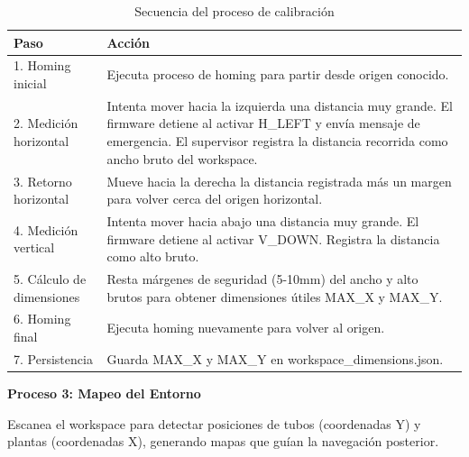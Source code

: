 \begin{table}[H]
\centering
\small
\begin{tabular}{|l|p{10cm}|}
\hline
\textbf{Paso} & \textbf{Acción} \\
\hline
1. Homing inicial & Ejecuta proceso de homing para partir desde origen conocido. \\
\hline
2. Medición horizontal & Intenta mover hacia la izquierda una distancia muy grande. El firmware detiene al activar H\_LEFT y envía mensaje de emergencia. El supervisor registra la distancia recorrida como ancho bruto del workspace. \\
\hline
3. Retorno horizontal & Mueve hacia la derecha la distancia registrada más un margen para volver cerca del origen horizontal. \\
\hline
4. Medición vertical & Intenta mover hacia abajo una distancia muy grande. El firmware detiene al activar V\_DOWN. Registra la distancia como alto bruto. \\
\hline
5. Cálculo de dimensiones & Resta márgenes de seguridad (5-10mm) del ancho y alto brutos para obtener dimensiones útiles MAX\_X y MAX\_Y. \\
\hline
6. Homing final & Ejecuta homing nuevamente para volver al origen. \\
\hline
7. Persistencia & Guarda MAX\_X y MAX\_Y en workspace\_dimensions.json. \\
\hline
\end{tabular}
\caption{Secuencia del proceso de calibración}
\label{tab:proceso_calibracion}
\end{table}

\textbf{Proceso 3: Mapeo del Entorno}

Escanea el workspace para detectar posiciones de tubos (coordenadas Y) y plantas (coordenadas X), generando mapas que guían la navegación posterior.


